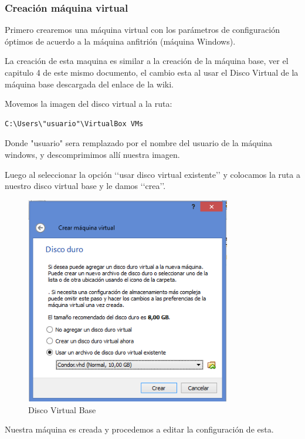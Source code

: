 \subsubsection*{Creación máquina virtual}
Primero crearemos una máquina virtual con los parámetros de configuración óptimos de acuerdo a la máquina anfitrión (máquina Windows).

La creación de esta maquina es similar a la creación de la máquina base, ver el capitulo 4 de este mismo documento, el cambio esta al usar el Disco Virtual de la máquina base descargada del enlace de la wiki.

Movemos la imagen del disco virtual a la ruta: 

\begin{lstlisting}
C:\Users\"usuario"\VirtualBox VMs
\end{lstlisting}
Donde "usuario" sera remplazado por el nombre del usuario de la máquina windows, y descomprimimos allí nuestra imagen.

Luego al seleccionar la opción ‘‘usar disco virtual existente’’ y colocamos la ruta a nuestro disco virtual base y le damos ‘‘crea’’.

\begin{figure}[h]
\centering
\includegraphics[width=0.8\textwidth]{windows/ddexistente.PNG}
\decoRule
\caption{Disco Virtual Base }
\label{fig:VHD Base}
\end{figure}
\FloatBarrier

Nuestra máquina es creada y procedemos a editar la configuración de esta.

